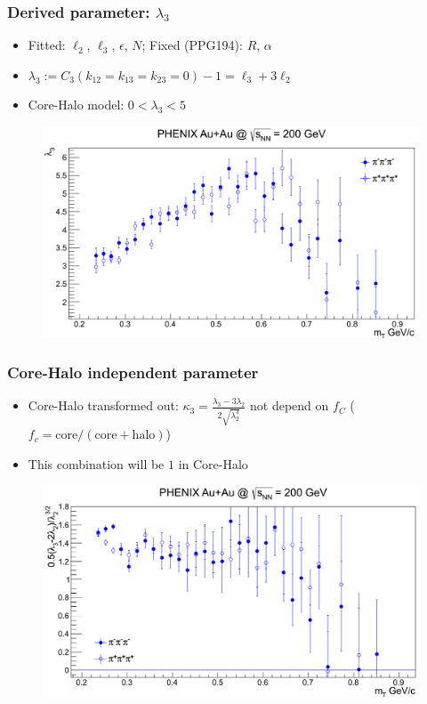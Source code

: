 \documentclass{beamer}
\begin{document}
\begin{frame}
\frametitle{Derived parameter: $\lambda_3$}
\begin{itemize}
\setlength{\itemsep}{10pt}
\item Fitted: $\ell_2$, $\ell_3$, $\epsilon$, $N$; Fixed (PPG194): $R$, $\alpha$
\item $\lambda_3 := C_3(k_{12}=k_{13}=k_{23}=0)-1 = \ell_3+3\ell_2$
\item Core-Halo model: $0<\lambda_3<5$
\end{itemize}
\begin{figure}
\includegraphics[scale=0.3]{pic/lambda3}
\end{figure}
\end{frame}



\begin{frame}
\frametitle{Core-Halo independent parameter}
\begin{itemize}
\item Core-Halo transformed out: $\kappa_3=\frac{\lambda_3-3\lambda_2}{2\sqrt{\lambda_2^3}}$ not depend on $f_C$ ($f_c=\mathrm{core}/(\mathrm{core}+\mathrm{halo})$)
\item This combination will be $1$ in Core-Halo
\end{itemize}
\begin{figure}
\includegraphics[scale=0.3]{pic/npar}
\end{figure}
\end{frame}
\end{document}
